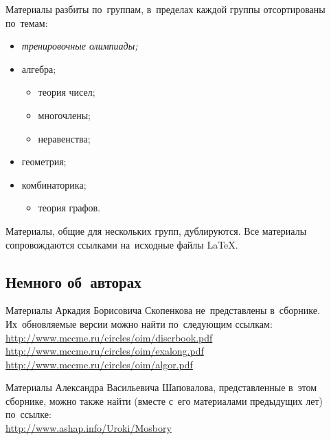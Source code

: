 Материалы разбиты по~группам, в~пределах каждой группы отсортированы по~темам:
\begin{itemize}
    \item \emph{тренировочные олимпиады;}
    \item алгебра;
    \begin{itemize}
        \item теория чисел;
        \item многочлены;
        \item неравенства;
    \end{itemize}
    \item геометрия;
    \item комбинаторика;
    \begin{itemize}
        \item теория графов.
    \end{itemize}
\end{itemize}

Материалы, общие для нескольких групп, дублируются.
\ifsourcelinks
Все материалы сопровождаются ссылками на~исходные файлы \LaTeX.
\fi


\subsection*{Немного об~авторах}

Материалы Аркадия Борисовича Скопенкова не~представлены в~сборнике.
Их~обновляемые версии можно найти по~следующим ссылкам:
\\
\url{http://www.mccme.ru/circles/oim/discrbook.pdf}
\\
\url{http://www.mccme.ru/circles/oim/exalong.pdf}
\\
\url{http://www.mccme.ru/circles/oim/algor.pdf}

Материалы Александра Васильевича Шаповалова, представленные в~этом сборнике,
можно также найти (вместе с~его материалами предыдущих лет) по~ссылке:
\\
\url{http://www.ashap.info/Uroki/Mosbory}

\endgroup

